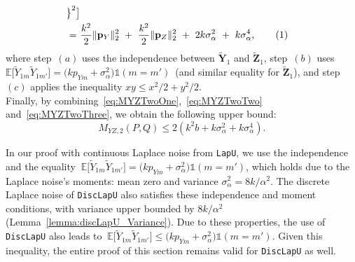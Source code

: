 \documentclass[twoside,11pt]{article}
\newcommand\numberthis{\addtocounter{equation}{1}\tag{\theequation}}
\newcommand{\rvTwo}{Y}
\newcommand{\rvThree}{Z}
\newcommand{\vectorize}[1]{\mathbf{#1}}
\newcommand{\mE}{\mathbb{E}} %
\newcommand{\alphabetSize}{k} %
\newcommand{\vectorIndex}{m}
\newcommand{\probVecElement}[2]{p_{{#1}{#2}}}
\newcommand{\probVec}{\mathbf{p}} %
\newcommand{\kernelMoment}{M} %
\newcommand{\dataGenDist}{P}  %
\newcommand{\privacyMechanism}{Q}
\newcommand{\privacyParameter}{\alpha} %
\newcommand{\LapUParam}{\sigma_{\privacyParameter}}
\newcommand{\momentTwosampleExpSquare}{\kernelMoment_{\rvTwo \rvThree,2}(\dataGenDist, \privacyMechanism)}
\begin{document}
\begin{appendix}
\begin{align*}
		\bigr\}^2
		\bigr]
		\\ =~&
		\frac{{\alphabetSize}^2}{2} 
		\|\probVec_\rvTwo\|^2_2
		~+~
		\frac{{\alphabetSize}^2}{2} 
		\|\probVec_\rvThree\|^2_2
		~+~
		2 {\alphabetSize} \LapUParam^2 
		~+~
		\alphabetSize \LapUParam^4, \numberthis \label{eq:MYZTwoThree}	
	\end{align*}
	\noindent
	where step~$(a)$ uses the independence between $\tilde{\vectorize{\rvTwo}}_1$ and $\tilde{\vectorize{\rvThree}}_1$,
	step~$(b)$ uses $
	\mE
	\bigl[
	\tilde{\rvTwo}_{1 \vectorIndex}
	\tilde{\rvTwo}_{1 \vectorIndex'}
	\bigr]
	=
	\bigl(
	\alphabetSize
	\probVecElement{\rvTwo}{\vectorIndex} + \LapUParam^2
	\bigr)
	\mathds{1}(\vectorIndex = \vectorIndex')$~(and similar equality for $\tilde{\vectorize{\rvThree}}_1$), and step~$(c)$ applies the inequality $xy \leq x^2/2 + y^2/2$.
	\\
	
	Finally, by combining~\eqref{eq:MYZTwoOne},~\eqref{eq:MYZTwoTwo} and~\eqref{eq:MYZTwoThree}, we obtain the following upper bound:
	\begin{equation}\label{upper_lapu_moment2}
		\momentTwosampleExpSquare
		\leq
		2
		(
		{\alphabetSize}^2
		{b} 
		+
		{\alphabetSize} \LapUParam^2
		+
		{\alphabetSize} \LapUParam^4	
		).
	\end{equation}
	\begin{remark} \label{remark: discrete laplace noise}
		In our proof with continuous Laplace noise from \textnormal{\texttt{LapU}},  we use the independence and the equality  
		$\
		\mE
		\bigl[
		\tilde{\rvTwo}_{1 \vectorIndex}
		\tilde{\rvTwo}_{1 \vectorIndex'}
		\bigr]
		=
		\bigl(
		{\alphabetSize}\probVecElement{\rvTwo}{\vectorIndex} + \LapUParam^2
		\bigr)
		\mathds{1}(\vectorIndex = \vectorIndex')$,
		which holds due to the Laplace noise's moments: mean zero and variance $\sigma_\alpha^2 = 8k/\alpha^2$. The discrete Laplace noise of \textnormal{\texttt{DiscLapU}} also satisfies these independence and moment conditions, with variance upper bounded by $8 \alphabetSize/\privacyParameter^2$ (Lemma~\ref{lemma:discLapU_Variance}).
		Due to these properties, the use of \textnormal{\texttt{DiscLapU}} also leads to
		$\
		\mE
		\bigl[
		\tilde{\rvTwo}_{1 \vectorIndex}
		\tilde{\rvTwo}_{1 \vectorIndex'}
		\bigr]
		\leq
		\bigl(
		{\alphabetSize}\probVecElement{\rvTwo}{\vectorIndex} + \LapUParam^2
		\bigr)
		\mathds{1}(\vectorIndex = \vectorIndex').$
		Given this inequality, the entire proof of this section remains valid for \textnormal{\texttt{DiscLapU}} as well.
	\end{remark}

\end{appendix}
\end{document}
